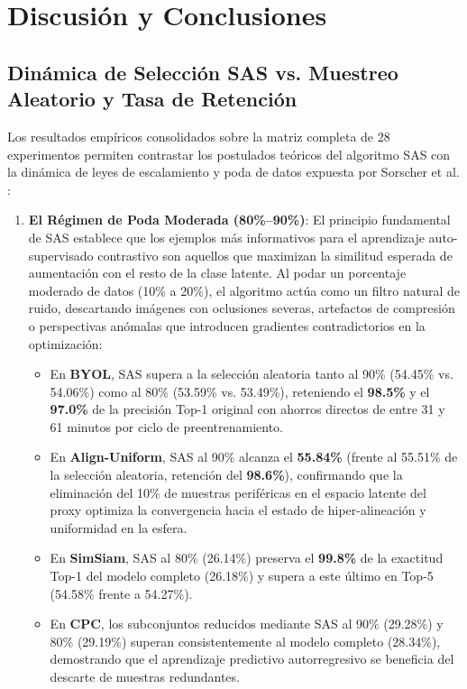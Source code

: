 \section{Discusión y Conclusiones}
\label{sec:discussion}

\subsection{Dinámica de Selección SAS vs. Muestreo Aleatorio y Tasa de Retención}
Los resultados empíricos consolidados sobre la matriz completa de 28 experimentos permiten contrastar los postulados teóricos del algoritmo SAS \cite{joshi2023sas} con la dinámica de leyes de escalamiento y poda de datos expuesta por Sorscher et al. \cite{sorscher2022beyond}:

\begin{enumerate}
    \item \textbf{El Régimen de Poda Moderada (80\%--90\%)}:
    El principio fundamental de SAS establece que los ejemplos más informativos para el aprendizaje auto-supervisado contrastivo son aquellos que maximizan la similitud esperada de aumentación con el resto de la clase latente. Al podar un porcentaje moderado de datos (10\% a 20\%), el algoritmo actúa como un filtro natural de ruido, descartando imágenes con oclusiones severas, artefactos de compresión o perspectivas anómalas que introducen gradientes contradictorios en la optimización:
    \begin{itemize}
        \item En \textbf{BYOL}, SAS supera a la selección aleatoria tanto al 90\% (54.45\% vs. 54.06\%) como al 80\% (53.59\% vs. 53.49\%), reteniendo el \textbf{98.5\%} y el \textbf{97.0\%} de la precisión Top-1 original con ahorros directos de entre 31 y 61 minutos por ciclo de preentrenamiento.
        \item En \textbf{Align-Uniform}, SAS al 90\% alcanza el \textbf{55.84\%} (frente al 55.51\% de la selección aleatoria, retención del \textbf{98.6\%}), confirmando que la eliminación del 10\% de muestras periféricas en el espacio latente del proxy optimiza la convergencia hacia el estado de hiper-alineación y uniformidad en la esfera.
        \item En \textbf{SimSiam}, SAS al 80\% (26.14\%) preserva el \textbf{99.8\%} de la exactitud Top-1 del modelo completo (26.18\%) y supera a este último en Top-5 (54.58\% frente a 54.27\%).
        \item En \textbf{CPC}, los subconjuntos reducidos mediante SAS al 90\% (29.28\%) y 80\% (29.19\%) superan consistentemente al modelo completo (28.34\%), demostrando que el aprendizaje predictivo autorregresivo se beneficia del descarte de muestras redundantes.
    \end{itemize}
    

\end{enumerate}
